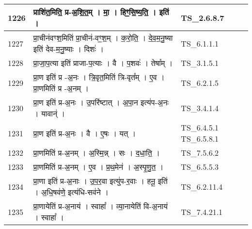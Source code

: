 \documentclass[17pt]{extarticle}
\begin{document}
\begin{longtable}{||p{0.4in}||p{4.9in}||p{0.9in}||}
    \hline
        
    1226 & प्राशि॑त॒मिति॒ प्र{-}अ॒शि॒त॒म्   ।   मा॒   ।   हिꣳ॒॒सि॒ष्य॒ति॒   ।   इति॑   ।    & TS\_2.6.8.7       \\
    
    \hline
        
    1227 & प्रा॒चीन॑वꣳश॒मिति॑ प्रा॒चीन॑{-}वꣳ॒॒श॒म्   ।   क॒रो॒ति॒   ।   दे॒व॒म॒नु॒ष्या इति॑ देव{-}म॒नु॒ष्याः   ।   दिशः॑   ।    & TS\_6.1.1.1       \\
    
    \hline
        
    1228 & प्रा॒जा॒प॒त्या इति॑ प्राजा{-}प॒त्याः   ।   वै   ।   प॒शवः॑   ।   तेषा᳚म्   ।    & TS\_3.1.5.1       \\
    
    \hline
        
    1229 & प्रा॒ण इति॑ प्र {-}अ॒नः   ।   त्रि॒वृत॒मिति॑ त्रि{-}वृत᳚म्   ।   ए॒व   ।   प्रा॒णमिति॑ प्र {-}अ॒नम्   ।    & TS\_6.2.1.5       \\
    
    \hline
        
    1230 & प्रा॒ण इति॑ प्र{-}अ॒नः   ।   उ॒परि॑ष्टात्   ।   अ॒पा॒न इत्य॑प{-}अ॒नः   ।   यावान्॑   ।    & TS\_3.4.1.4       \\
    
    \hline
        
    1231 & प्रा॒ण इति॑ प्र{-}अ॒नः   ।   वै   ।   ए॒षः   ।   यत्   ।    & TS\_6.4.5.1 TS\_6.5.8.1       \\
    
    \hline
        
    1232 & प्रा॒णमिति॑ प्र{-}अ॒नम्   ।   अ॒स्मि॒न्न्   ।   सः   ।   द॒धा॒ति॒   ।    & TS\_7.5.6.2       \\
    
    \hline
        
    1233 & प्रा॒णमिति॑ प्र{-}अ॒नम्   ।   ए॒व   ।   प्र॒थ॒मेन॑   ।   अ॒स्पृ॒णु॒त॒   ।    & TS\_6.5.5.3       \\
    
    \hline
        
    1234 & प्रा॒णा इति॑ प्र{-}अ॒नाः   ।   उ॒प॒र॒वा इत्यु॑प{-}र॒वाः   ।   हनू॒ इति॑   ।   अ॒धि॒षव॑णे॒ इत्य॑धि{-}सव॑ने   ।    & TS\_6.2.11.4       \\
    
    \hline
        
    1235 & प्रा॒णायेति॑ प्र{-}अ॒नाय॑   ।   स्वाहा᳚   ।   व्या॒नायेति॑ वि{-}अ॒नाय॑   ।   स्वाहा᳚   ।    & TS\_7.4.21.1       \\
    

\end{longtable}
\end{document}
